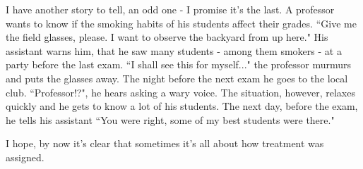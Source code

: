 I have another story to tell, an odd one - I promise it's the last.
A professor wants to know if the smoking habits of his students affect their grades. “Give me the field glasses, please. I want to observe the backyard from up here." His assistant warns him, that he saw many students - among them smokers - at a party before the last exam. “I shall see this for myself..." the professor murmurs and puts the glasses away. The night before the next exam he goes to the local club. “Professor!?", he hears asking a wary voice. The situation, however, relaxes quickly and he gets to know a lot of his students. The next day, before the exam, he tells his assistant “You were right, some of my best students were there."

I hope, by now it's clear that sometimes it's all about how treatment was assigned.
%
%
%
%
%
%
%
%
